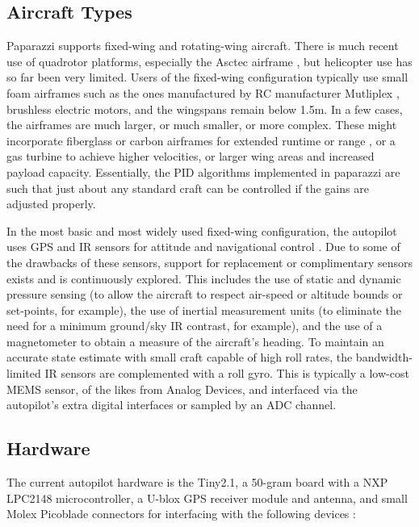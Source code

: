 \documentclass[a4paper,11pt]{report}
\begin{document}
\subsection{Aircraft Types}

Paparazzi supports fixed-wing and rotating-wing aircraft. There is much recent use of quadrotor platforms, especially the Asctec airframe \cite{asctec}, but helicopter use has so far been very limited. Users of the fixed-wing configuration typically use small foam airframes such as the ones manufactured by RC manufacturer Mutliplex \cite{multiplex}, brushless electric motors, and the wingspans remain below 1.5m. In a few cases, the airframes are much larger, or much smaller, or more complex. These might incorporate fiberglass or carbon airframes for extended runtime \cite{murat} or range \cite{corsica}, or a gas turbine to achieve higher velocities, or larger wing areas and increased payload capacity. Essentially, the PID algorithms implemented in paparazzi are such that just about any standard craft can be controlled if the gains are adjusted properly.

In the most basic and most widely used fixed-wing configuration, the autopilot uses GPS and IR sensors for attitude and navigational control \cite{paparazzi_paper}. Due to some of the drawbacks of these sensors, support for replacement or complimentary sensors exists and is continuously explored. This includes the use of static and dynamic pressure sensing (to allow the aircraft to respect air-speed or altitude bounds or set-points, for example), the use of inertial measurement units (to eliminate the need for a minimum ground/sky IR contrast, for example), and the use of a magnetometer to obtain a measure of the aircraft's heading. To maintain an accurate state estimate with small craft capable of high roll rates, the bandwidth-limited IR sensors are complemented with a roll gyro. This is typically a low-cost MEMS sensor, of the likes from Analog Devices, and interfaced via the autopilot's extra digital interfaces or sampled by an ADC channel.

\subsection{Hardware}

The current autopilot hardware is the Tiny2.1, a 50-gram board with a NXP LPC2148 microcontroller, a U-blox GPS receiver module and antenna, and small Molex Picoblade connectors for interfacing with the following devices :
\end{document}
